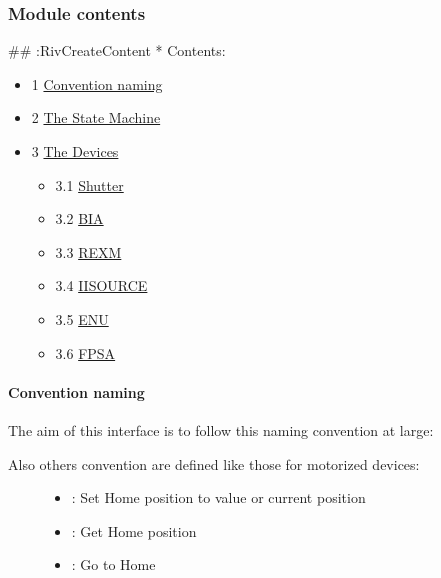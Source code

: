 \documentclass[letterpaper,10pt,english]{sphinxmanual}
\begin{document}
\subsubsection{Module contents}
\label{enuActor.Devices:module-contents}\label{enuActor.Devices:module-enuActor.Devices}
\#\# :RivCreateContent
* Contents:
\begin{itemize}
\item {} 
1 {\hyperref[enuActor.Devices:convention-naming]{Convention naming}}

\item {} 
2 {\hyperref[enuActor.Devices:the-state-machine]{The State Machine}}

\item {} 
3 {\hyperref[enuActor.Devices:the-devices]{The Devices}}
\begin{itemize}
\item {} 
3.1 {\hyperref[enuActor.Devices:shutter]{Shutter}}

\item {} 
3.2 {\hyperref[enuActor.Devices:bia]{BIA}}

\item {} 
3.3 {\hyperref[enuActor.Devices:rexm]{REXM}}

\item {} 
3.4 {\hyperref[enuActor.Devices:iisource]{IISOURCE}}

\item {} 
3.5 {\hyperref[enuActor.Devices:enu]{ENU}}

\item {} 
3.6 {\hyperref[enuActor.Devices:fpsa]{FPSA}}

\end{itemize}

\end{itemize}


\paragraph{Convention naming}
\label{enuActor.Devices:convention-naming}
The aim of this interface is to follow this naming convention at large:

\begin{description}
\item[{Also others convention are defined like those for motorized devices:}] \leavevmode\begin{itemize}
\item {} 
: Set Home position to value or current position

\item {} 
: Get Home position

\item {} 
 : Go to Home

\end{itemize}

\end{description}
\end{document}
